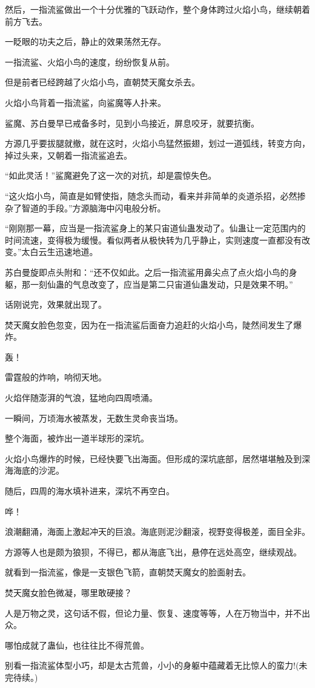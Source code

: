 \begin{this_body}
然后，一指流鲨做出一个十分优雅的飞跃动作，整个身体跨过火焰小鸟，继续朝着前方飞去。

一眨眼的功夫之后，静止的效果荡然无存。

一指流鲨、火焰小鸟的速度，纷纷恢复从前。

但是前者已经跨越了火焰小鸟，直朝焚天魔女杀去。

火焰小鸟背着一指流鲨，向鲨魔等人扑来。

鲨魔、苏白曼早已戒备多时，见到小鸟接近，屏息咬牙，就要抗衡。

方源几乎要拔腿就撤，就在这时，火焰小鸟猛然振翅，划过一道弧线，转变方向，掉过头来，又朝着一指流鲨追去。

“如此灵活！”鲨魔避免了这一次的对抗，却是震惊失色。

“这火焰小鸟，简直是如臂使指，随念头而动，看来并非简单的炎道杀招，必然掺杂了智道的手段。”方源脑海中闪电般分析。

“刚刚那一幕，应当是一指流鲨身上的某只宙道仙蛊发动了。仙蛊让一定范围内的时间流速，变得极为缓慢。看似两者从极快转为几乎静止，实则速度一直都没有改变。”太白云生迅速地道。

苏白曼旋即点头附和：“还不仅如此。之后一指流鲨用鼻尖点了点火焰小鸟的身躯，那一刻仙蛊的气息改变了，应当是第二只宙道仙蛊发动，只是效果不明。”

话刚说完，效果就出现了。

焚天魔女脸色忽变，因为在一指流鲨后面奋力追赶的火焰小鸟，陡然间发生了爆炸。

轰！

雷霆般的炸响，响彻天地。

火焰伴随澎湃的气浪，猛地向四周喷涌。

一瞬间，万顷海水被蒸发，无数生灵命丧当场。

整个海面，被炸出一道半球形的深坑。

火焰小鸟爆炸的时候，已经快要飞出海面。但形成的深坑底部，居然堪堪触及到深海海底的沙泥。

随后，四周的海水填补进来，深坑不再空白。

哗！

浪潮翻涌，海面上激起冲天的巨浪。海底则泥沙翻滚，视野变得极差，面目全非。

方源等人也是颇为狼狈，不得已，都从海底飞出，悬停在远处高空，继续观战。

就看到一指流鲨，像是一支银色飞箭，直朝焚天魔女的脸面射去。

焚天魔女脸色微凝，哪里敢硬接？

人是万物之灵，这句话不假，但论力量、恢复、速度等等，人在万物当中，并不出众。

哪怕成就了蛊仙，也往往比不得荒兽。

别看一指流鲨体型小巧，却是太古荒兽，小小的身躯中蕴藏着无比惊人的蛮力!(未完待续。)

\end{this_body}

